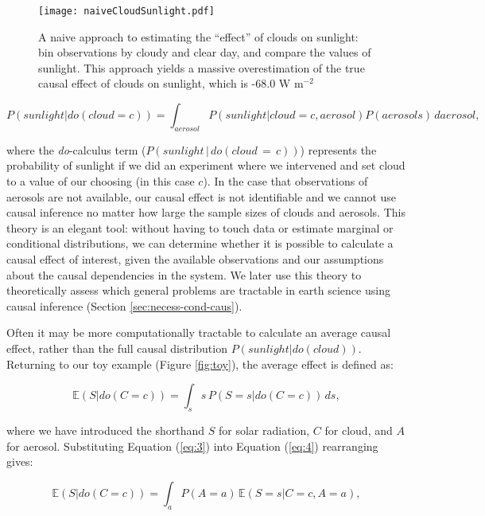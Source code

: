 \documentclass[12pt]{article}
\begin{document}
\begin{figure}
  \texttt{[image: naiveCloudSunlight.pdf]}
  \caption{A naive approach to estimating the ``effect'' of clouds on
    sunlight: bin observations by cloudy and clear day, and compare
    the values of sunlight. This approach yields a massive
    overestimation of the true causal effect of clouds on sunlight,
    which is -68.0 W m$^{-2}$}
  \label{fig:naive-cloud-sunlight}
\end{figure}

\begin{equation}
  P(sunlight | do(cloud = c)) = \int_{aerosol} P(sunlight| cloud = c,
  aerosol) P(aerosols) \, d aerosol,
  \label{eq:3}
\end{equation}

where the \textit{do}-calculus \citep{pearl2009} term
($P(sunlight \, | \, do(cloud\, = \,c))$) represents the probability of
sunlight if we did an experiment where we intervened and set cloud to
a value of our choosing (in this case $c$). In the case that
observations of aerosols are not available, our causal effect is not
identifiable and we cannot use causal inference no matter how large
the sample sizes of clouds and aerosols. This theory is an elegant
tool: without having to touch data or estimate marginal or conditional
distributions, we can determine whether it is possible to calculate a
causal effect of interest, given the available observations and our
assumptions about the causal dependencies in the system. We later use
this theory to theoretically assess which general problems are
tractable in earth science using causal inference (Section
\ref{sec:necess-cond-caus}).

Often it may be more computationally tractable to calculate an average
causal effect, rather than the full causal distribution
$P(sunlight | do(cloud))$. Returning to our toy example (Figure
\ref{fig:toy}), the average effect is defined as:

\begin{equation}
  \mathbb{E}(S | do(C = c)) = \int_{s} s \, P(S = s
  | do(C=c)) \, ds,
  \label{eq:4}
\end{equation}

where we have introduced the shorthand $S$ for solar radiation, $C$
for cloud, and $A$ for aerosol. Substituting Equation (\ref{eq:3})
into Equation (\ref{eq:4}) rearranging gives:

\begin{equation}
  \mathbb{E}(S | do(C = c))  = \int_{a} P(A=a) \, \mathbb{E}(S=s |
  C=c, A=a),
  \label{eq:5}
\end{equation}
\end{document}
